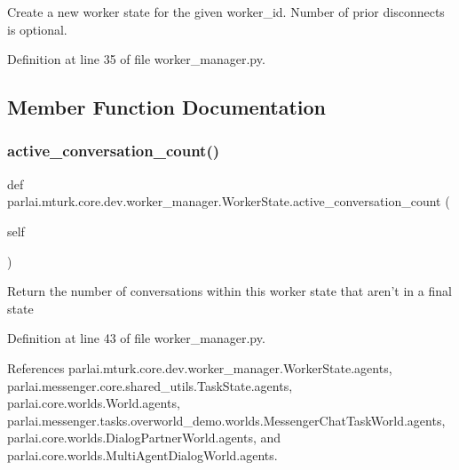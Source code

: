 \begin{DoxyVerb}Create a new worker state for the given worker_id. Number of
prior disconnects is optional.
\end{DoxyVerb}
 

Definition at line 35 of file worker\+\_\+manager.\+py.



\subsection{Member Function Documentation}
\mbox{\label{classparlai_1_1mturk_1_1core_1_1dev_1_1worker__manager_1_1WorkerState_a16edfbd2d655096cbd8c42ab44aad988}} 
\subsubsection{\texorpdfstring{active\+\_\+conversation\+\_\+count()}{active\_conversation\_count()}}
{\footnotesize\ttfamily def parlai.\+mturk.\+core.\+dev.\+worker\+\_\+manager.\+Worker\+State.\+active\+\_\+conversation\+\_\+count (\begin{DoxyParamCaption}\item[{}]{self }\end{DoxyParamCaption})}

\begin{DoxyVerb}Return the number of conversations within this worker state
that aren't in a final state
\end{DoxyVerb}
 

Definition at line 43 of file worker\+\_\+manager.\+py.



References parlai.\+mturk.\+core.\+dev.\+worker\+\_\+manager.\+Worker\+State.\+agents, parlai.\+messenger.\+core.\+shared\+\_\+utils.\+Task\+State.\+agents, parlai.\+core.\+worlds.\+World.\+agents, parlai.\+messenger.\+tasks.\+overworld\+\_\+demo.\+worlds.\+Messenger\+Chat\+Task\+World.\+agents, parlai.\+core.\+worlds.\+Dialog\+Partner\+World.\+agents, and parlai.\+core.\+worlds.\+Multi\+Agent\+Dialog\+World.\+agents.

